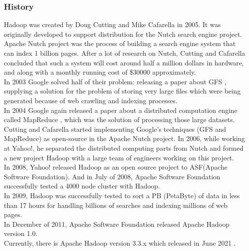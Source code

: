 \documentclass[\main/main.tex]{subfiles}
\begin{document}
\subsubsection{History}
Hadoop was created by Doug Cutting and Mike Cafarella in 2005. It was originally developed to support distribution for the Nutch search engine project. Apache Nutch project was the process of building a search engine system that can index 1 billion pages. After a lot of research on Nutch, Cutting and Cafarella concluded that such a system will cost around half a million dollars in hardware, and along with a monthly running cost of \$30000 approximately. \\
In 2003 Google solved half of their problem: releasing a paper about GFS \cite{GhemawatSanjay2003TheGF}, supplying a solution for the problem of storing very large files which were being generated because of web crawling and indexing processes. \\
In 2004 Google again released a paper about a distributed computation engine called MapReduce \cite{Dean2004MapReduceSD}, which was the solution of processing those large datasets. Cutting and Cafarella started implementing Google’s techniques (GFS and MapReduce) as open-source in the Apache Nutch project. 
In 2006, while working at Yahoo!, he separated the distributed computing parts from Nutch and formed a new project Hadoop with a large team of engineers working on this project. \\
In 2008, Yahoo! released Hadoop as an open source project to ASF(Apache Software Foundation). And in July of 2008, Apache Software Foundation successfully tested a 4000 node cluster with Hadoop. \\
In 2009, Hadoop was successfully tested to sort a PB (PetaByte) of data in less than 17 hours for handling billions of searches and indexing millions of web pages. \\
In December of 2011, Apache Software Foundation released Apache Hadoop version 1.0. \\
Currently, there is Apache Hadoop version 3.3.x which released in June 2021 \cite{hadoop_history}.
\end{document}
